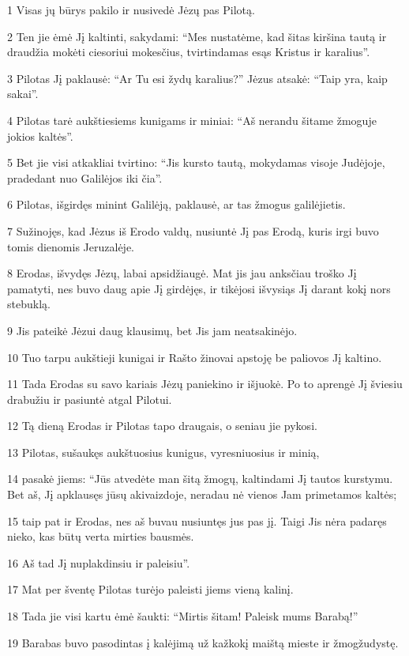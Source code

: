 \par 1 Visas jų būrys pakilo ir nusivedė Jėzų pas Pilotą. 
\par 2 Ten jie ėmė Jį kaltinti, sakydami: “Mes nustatėme, kad šitas kiršina tautą ir draudžia mokėti ciesoriui mokesčius, tvirtindamas esąs Kristus ir karalius”. 
\par 3 Pilotas Jį paklausė: “Ar Tu esi žydų karalius?” Jėzus atsakė: “Taip yra, kaip sakai”. 
\par 4 Pilotas tarė aukštiesiems kunigams ir miniai: “Aš nerandu šitame žmoguje jokios kaltės”. 
\par 5 Bet jie visi atkakliai tvirtino: “Jis kursto tautą, mokydamas visoje Judėjoje, pradedant nuo Galilėjos iki čia”. 
\par 6 Pilotas, išgirdęs minint Galilėją, paklausė, ar tas žmogus galilėjietis. 
\par 7 Sužinojęs, kad Jėzus iš Erodo valdų, nusiuntė Jį pas Erodą, kuris irgi buvo tomis dienomis Jeruzalėje. 
\par 8 Erodas, išvydęs Jėzų, labai apsidžiaugė. Mat jis jau anksčiau troško Jį pamatyti, nes buvo daug apie Jį girdėjęs, ir tikėjosi išvysiąs Jį darant kokį nors stebuklą. 
\par 9 Jis pateikė Jėzui daug klausimų, bet Jis jam neatsakinėjo. 
\par 10 Tuo tarpu aukštieji kunigai ir Rašto žinovai apstoję be paliovos Jį kaltino. 
\par 11 Tada Erodas su savo kariais Jėzų paniekino ir išjuokė. Po to aprengė Jį šviesiu drabužiu ir pasiuntė atgal Pilotui. 
\par 12 Tą dieną Erodas ir Pilotas tapo draugais, o seniau jie pykosi. 
\par 13 Pilotas, sušaukęs aukštuosius kunigus, vyresniuosius ir minią, 
\par 14 pasakė jiems: “Jūs atvedėte man šitą žmogų, kaltindami Jį tautos kurstymu. Bet aš, Jį apklausęs jūsų akivaizdoje, neradau nė vienos Jam primetamos kaltės; 
\par 15 taip pat ir Erodas, nes aš buvau nusiuntęs jus pas jį. Taigi Jis nėra padaręs nieko, kas būtų verta mirties bausmės. 
\par 16 Aš tad Jį nuplakdinsiu ir paleisiu”. 
\par 17 Mat per šventę Pilotas turėjo paleisti jiems vieną kalinį. 
\par 18 Tada jie visi kartu ėmė šaukti: “Mirtis šitam! Paleisk mums Barabą!” 
\par 19 Barabas buvo pasodintas į kalėjimą už kažkokį maištą mieste ir žmogžudystę. 
